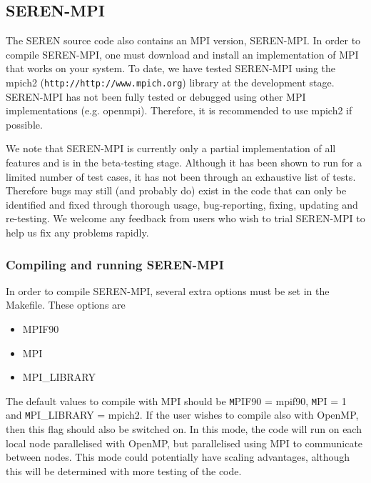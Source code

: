 \documentclass[a4paper]{article}
\newcommand{\var}[1]{\texttt{#1}}
\begin{document}
\newpage

\subsection{SEREN-MPI} \label{SS:MPISEREN}

The SEREN source code also contains an MPI version, SEREN-MPI.  In order to compile SEREN-MPI, one must download and install an implementation of MPI that works on your system.   To date, we have tested SEREN-MPI using the mpich2 (\var{http://http://www.mpich.org}) library at the development stage.  SEREN-MPI has not been fully tested or debugged using other MPI implementations (e.g. openmpi).  Therefore, it is recommended to use mpich2 if possible.  

We note that SEREN-MPI is currently only a partial implementation of all features and is in the beta-testing stage.  Although it has been shown to run for a limited number of test cases, it has not been through an exhaustive list of tests.  Therefore bugs may still (and probably do) exist in the code that can only be identified and fixed through thorough usage, bug-reporting, fixing, updating and re-testing.  We welcome any feedback from users who wish to trial SEREN-MPI to help us fix any problems rapidly.


\subsubsection{Compiling and running SEREN-MPI}
In order to compile SEREN-MPI, several extra options must be set in the Makefile.  These options are 
\begin{itemize}
\item MPIF90
\item MPI
\item MPI\_LIBRARY
\end{itemize}
The default values to compile with MPI should be {\var MPIF90 = mpif90}, {\var MPI = 1} and {\var MPI\_LIBRARY = mpich2}.  If the user wishes to compile also with OpenMP, then this flag should also be switched on.  In this mode, the code will run on each local node parallelised with OpenMP, but parallelised using MPI to communicate between nodes.  This mode could potentially have scaling advantages, although this will be determined with more testing of the code. \newline
\end{document}
